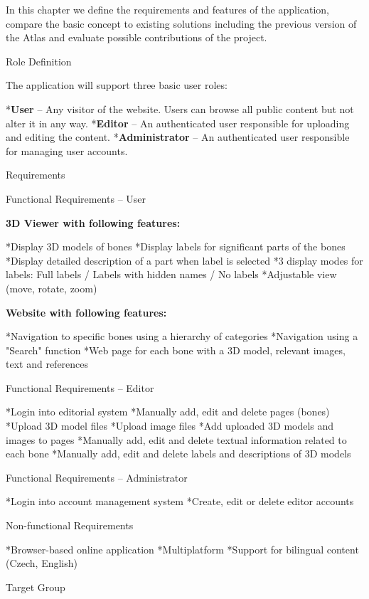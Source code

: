 In this chapter we define the requirements and features of the application, compare the basic concept to existing solutions including the previous version of the Atlas and evaluate possible contributions of the project.

\sec Role Definition

The application will support three basic user roles:

\begitems
*{\bf User} -- Any visitor of the website. Users can browse all public content but not alter it in any way.
*{\bf Editor} -- An authenticated user responsible for uploading and editing the content.
*{\bf Administrator} -- An authenticated user responsible for managing user accounts.
\enditems

\sec Requirements

\secc Functional Requirements -- User

\vskip 10pt
{\bf 3D Viewer with following features:}

\begitems
*Display 3D models of bones
*Display labels for significant parts of the bones
*Display detailed description of a part when label is selected
*3 display modes for labels: Full labels / Labels with hidden names / No labels
*Adjustable view (move, rotate, zoom)
\enditems

\vskip 10pt
{\bf Website with following features:}

\begitems
*Navigation to specific bones using a hierarchy of categories
*Navigation using a "Search" function
*Web page for each bone with a 3D model, relevant images, text and references
\enditems

\secc Functional Requirements -- Editor

\begitems
*Login into editorial system
*Manually add, edit and delete pages (bones)
*Upload 3D model files
*Upload image files
*Add uploaded 3D models and images to pages
*Manually add, edit and delete textual information related to each bone
*Manually add, edit and delete labels and descriptions of 3D models
\enditems

\secc Functional Requirements -- Administrator

\begitems
*Login into account management system
*Create, edit or delete editor accounts
\enditems

\secc Non-functional Requirements

\begitems
*Browser-based online application
*Multiplatform
*Support for bilingual content (Czech, English)
\enditems

\sec Target Group


